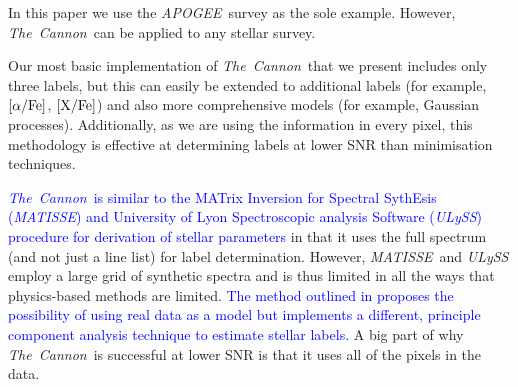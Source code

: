 \documentclass[12pt, preprint]{aastex}
\newcommand{\tc}{\textsl{The~Cannon}}
\newcommand{\apogee}{\textsl{APOGEE}}
\newcommand{\matisse}{\textsl{MATISSE}}
\newcommand{\xfe}{\mbox{$\rm [X/Fe]$}}
\newcommand{\alphafe}{\mbox{$\rm [\alpha/Fe]$}}
\begin{document}

In this paper we use the \apogee\ survey as the sole example. 
However, \tc\ can be applied to any stellar survey.  

Our most basic implementation of \tc\ that we present includes only three labels, but this can easily be extended to additional labels  (for example, \alphafe, \xfe) and also more comprehensive models (for example, Gaussian processes). 
Additionally, as we are using the information in every pixel, this methodology is effective at determining labels at lower SNR than minimisation techniques.

\textcolor{blue}{ \tc\ is similar to the MATrix Inversion for Spectral SythEsis (\matisse) and  University of Lyon Spectroscopic analysis Software (\textit{ULySS}) procedure
for derivation of stellar parameters \citep{RB2006, Koleva2009}} in that it uses the full spectrum
(and not just a line list) for label determination.
However, \matisse\ and \textit{ULySS} employ a large grid of synthetic spectra
and is thus limited in all the ways that physics-based methods are limited. \textcolor{blue}{ The method outlined in \citet{fio2007} proposes the possibility of using real data as a model but implements a different, principle component analysis technique to estimate stellar labels.}
A big part of why \tc\ is successful at lower SNR
is that it uses all of the pixels in the data.
\end{document}
